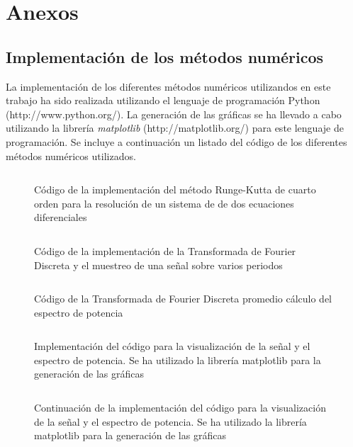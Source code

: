\documentclass[11pt]{article}
\begin{document}
\pagebreak
\section{Anexos}

\subsection{Implementación de los métodos numéricos}
La implementación de los diferentes métodos numéricos utilizandos en este trabajo ha sido realizada utilizando el lenguaje de programación Python (http://www.python.org/). La generación de las gráficas se ha llevado a cabo utilizando la librería \textit{matplotlib} (http://matplotlib.org/) para este lenguaje de programación. Se incluye a continuación un listado del código de los diferentes métodos numéricos utilizados.

\begin{figure}
\inputminted[linenos, firstline=22, lastline=66, fontsize=\footnotesize]{python}{../metodos/eq_diferenciales.py}
\caption{Código de la implementación del método Runge-Kutta de cuarto orden para la resolución de un sistema de de dos ecuaciones diferenciales}
\label{runge_kutta_code}
\end{figure}

\begin{figure}
\inputminted[linenos, firstline=1, lastline=41, fontsize=\footnotesize]{python}{../metodos/transformada_fourier.py}
\caption{Código de la implementación de la Transformada de Fourier Discreta y el muestreo de una señal sobre varios periodos}
\end{figure}

\begin{figure}
\inputminted[linenos, firstline=43, lastline=83, fontsize=\footnotesize]{python}{../metodos/transformada_fourier.py}
\caption{Código de la Transformada de Fourier Discreta promedio cálculo del espectro de potencia}
\end{figure}

\begin{figure}
\inputminted[linenos, firstline=1, lastline=28, fontsize=\footnotesize]{python}{../graficas.py}
\caption{Implementación del código para la visualización de la señal y el espectro de potencia.
Se ha utilizado la librería matplotlib para la generación de las gráficas}
\end{figure}

\begin{figure}
\inputminted[linenos, firstline=29, lastline=61, firstnumber=29]{python}{../graficas.py}
\caption{Continuación de la implementación del código para la visualización de la señal y el espectro de potencia.
Se ha utilizado la librería matplotlib para la generación de las gráficas}
\end{figure}
\end{document}
